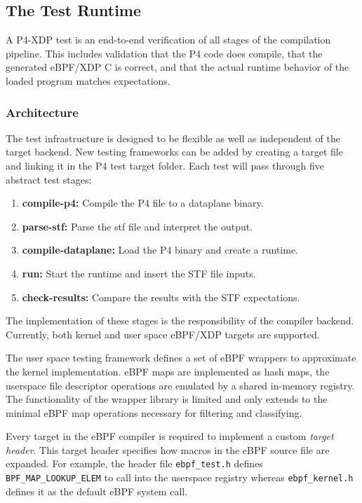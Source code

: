 \subsection{The Test Runtime}
A P4-XDP test is an end-to-end verification of all stages of 
the compilation pipeline. This includes validation that the P4 code does 
compile, that the generated eBPF/XDP C is correct, and that the actual runtime 
behavior of the loaded program matches expectations.

\subsubsection{Architecture}
The test infrastructure is designed to be flexible as well as independent of 
the target backend. New testing frameworks can be added by creating a target 
file and linking it in the P4 test target folder. Each test will pass through 
five abstract test stages:\\
\begin{enumerate}
\item\textbf{compile-p4:} Compile the P4 file to a dataplane binary.
\item \textbf{parse-stf:} Parse the stf file and interpret the output.
\item \textbf{compile-dataplane:} Load the P4 binary and create a runtime.
\item \textbf{run:} Start the runtime and insert the STF file inputs.
\item \textbf{check-results:} Compare the results with the STF 
expectations.
\end{enumerate}

The implementation of these stages is the responsibility of the compiler 
backend.
Currently, both kernel and user space eBPF/XDP targets are supported.

The user space testing framework defines a set of eBPF wrappers to approximate 
the kernel implementation. eBPF maps are implemented as hash maps, the 
userspace file descriptor operations are emulated by a shared in-memory 
registry. 
The functionality of the wrapper library is limited and only extends to the 
minimal eBPF map operations necessary for filtering and classifying.

Every target in the eBPF compiler is required to implement a custom 
\textit{target header}. This target header specifies how macros in the eBPF 
source file are expanded. For example, the header file \texttt{ebpf\_test.h} 
defines \texttt{BPF\_MAP\_LOOKUP\_ELEM} to call into the userspace registry 
whereas \texttt{ebpf\_kernel.h} defines it as the default eBPF system call.

